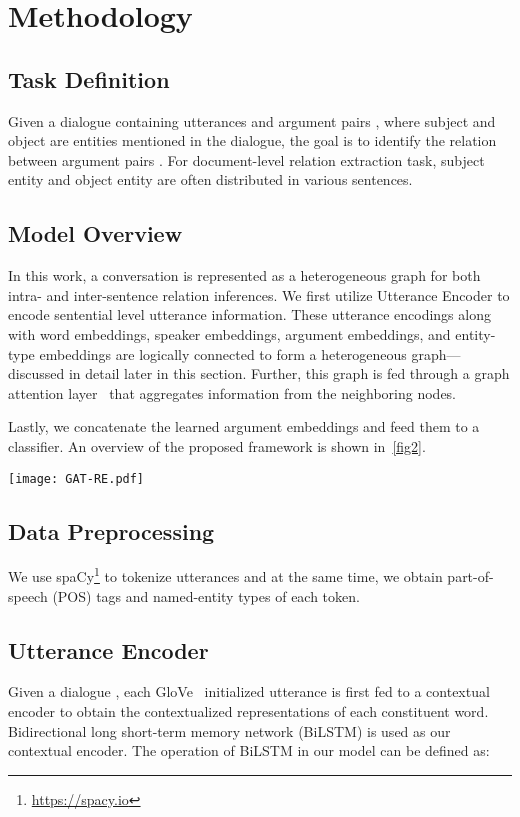\documentclass[letterpaper]{article} \usepackage{aaai21}  \usepackage{times}  \usepackage{helvet} \usepackage{courier}  \usepackage[hyphens]{url}  \usepackage{graphicx} \urlstyle{rm} \def\UrlFont{\rm}  \usepackage{natbib}  \usepackage{caption} \frenchspacing  \setlength{\pdfpagewidth}{8.5in}  \setlength{\pdfpageheight}{11in}
\begin{document}
\section{Methodology}
\label{method}
\subsection{Task Definition}

Given a dialogue containing  utterances  and argument pairs , where subject  and object  are entities mentioned in the dialogue, the goal is to identify the relation between argument pairs . For document-level relation extraction task, subject entity and object entity are often distributed in various sentences.


\subsection{Model Overview}
In this work, a conversation is represented as a heterogeneous graph for both intra- and inter-sentence relation inferences.
We first utilize Utterance Encoder to encode sentential level utterance information.
These utterance encodings along with word embeddings, speaker embeddings, argument embeddings, and entity-type embeddings are logically connected to form a heterogeneous graph---discussed in detail later in this section. Further, this graph is fed through a graph attention layer~\cite{velivckovic2017graph} that aggregates information from the neighboring nodes.

Lastly, we concatenate the learned argument embeddings and feed them to a classifier. An overview of the proposed framework is shown in~\cref{fig2}.


\begin{figure*}[ht]
\centering
\texttt{[image: GAT-RE.pdf]} \caption{An overview of the proposed framework.}
\label{fig2}
\end{figure*}


\subsection{Data Preprocessing}
We use spaCy\footnote{\url{https://spacy.io}} to tokenize  utterances and at the same time, we obtain part-of-speech (POS) tags and named-entity types of each token.

\subsection{Utterance Encoder}
Given a dialogue , each GloVe~\cite{pennington2014glove} initialized utterance  is first fed to a contextual encoder to obtain the contextualized representations of each constituent word. Bidirectional long short-term memory network (BiLSTM) is used as our contextual encoder. The operation of BiLSTM in our model can be defined as:
\end{document}
